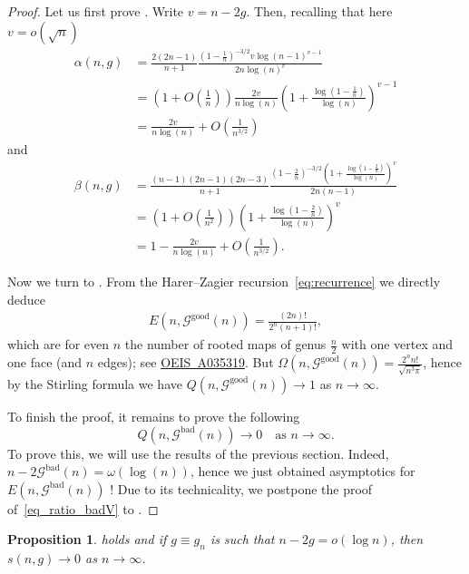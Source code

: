 \documentclass[a4paper,12pt]{article}
\newtheorem{proposition}[theorem]{Proposition}
\theoremstyle{definition}
\newcommand{\OEIS}[1]{\href{http://oeis.org/#1}{OEIS~#1}}
\newcommand{\nto}{\ensuremath{n\rightarrow\infty}}
\newcommand{\smallv}{\ensuremath{n-2g =o(\log n)}}
\newcommand{\bigO}[1]{O\left({#1}\right)}
\newcommand{\bigpar}[1]{\left({#1}\right)}
\newcommand{\good}[1]{\mathcal{G}^{\text{good}}({#1})}
\newcommand{\goodG}{\good{n}}
\newcommand{\bad}[1]{\mathcal{G}^{\text{bad}}({#1})}
\newcommand{\badG}{\bad{n}}
\begin{document}
\begin{proof}\label{prop_alpha_beta_smallv}
Let us first prove .
Write $v=n-2g$. Then, recalling that here $v=o(\sqrt n)$
\begin{align}
    \alpha(n,g)&=\frac{2(2n-1)}{n+1}\frac{\bigpar{1-\frac{1}{n}}^{-3/2}v{\log\bigpar{n-1}^{v-1}}}{2n\log(n)^v}\\
    &=\bigpar{1+\bigO{\frac{1}{n}}}\frac{2v}{n\log(n)}\bigpar{1+\frac{\log\bigpar{1-\frac{1}{n}}}{\log(n)}}^{v-1}\\
    &=\frac{2v}{n\log(n)} +\bigO{\frac{1}{n^{3/2}}}
\end{align}
and 
\begin{align}
    \beta(n,g)&=\frac{(n-1)(2n-1)(2n-3)}{n+1}\frac{\bigpar{1-\frac{2}{n}}^{-3/2}\bigpar{1+\frac{\log\bigpar{1-\frac{2}{n}}}{\log(n)}}^{v}}{2n(n-1)}\\
    &=\bigpar{1+\bigO{\frac{1}{n^2}}}\bigpar{1+\frac{\log\bigpar{1-\frac{2}{n}}}{\log(n)}}^{v}\\
    &=1-\frac{2v}{n\log(n)} +\bigO{\frac{1}{n^{3/2}}}.
\end{align}

Now we turn to .  From the Harer--Zagier recursion~\eqref{eq:recurrence} we directly deduce
\begin{align*}
    E(n,\goodG)
        =\frac{(2n)!}{2^{n}(n+1)!},
\end{align*}
which are for even $n$ the number of rooted maps of genus $\frac{n}{2}$ with one vertex and one face (and $n$ edges); see \OEIS{A035319}.
%
But $\Omega(n,\goodG)=\frac{2^nn!}{\sqrt{n^3\pi}}$, hence by the Stirling formula we have $Q(n,\goodG)\to 1$ as $\nto$.

To finish the proof, it remains to prove the following 
\begin{equation}\label{eq_ratio_badV}
    Q(n,\badG)\to 0\quad \text{as }\nto.
\end{equation}
To prove this, we will use the results of the previous section. Indeed, $n-2\badG=\omega(\log(n))$, hence we just obtained asymptotics for $E(n,\badG)$ ! Due to its technicality, we postpone the proof of~\eqref{eq_ratio_badV} to .
\end{proof}

\begin{proposition}\label{prop_s_smallv}
     holds and if $g\equiv g_n$ is such that $\smallv$, then $s(n,g)\to 0$ as $\nto$.
\end{proposition}
\end{document}
